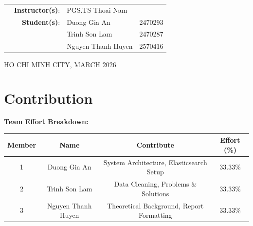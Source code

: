 \begin{titlepage}
\begin{table}[h]
\begin{tabular}{rrll}
\hspace{1 cm} & \textbf{Instructor(s)}: & PGS.TS Thoai Nam\\
        
& \textbf{Student(s)}: & Duong Gia An & 2470293\\
& & Trinh Son Lam & 2470287\\
& & Nguyen Thanh Huyen & 2570416\\

\end {tabular}
\end{table}
\vspace{1cm}
\begin{center}
{\footnotesize HO CHI MINH CITY, MARCH 2026}
\end{center}
\end{titlepage}

\newpage

\chapter*{Contribution}

\textbf{Team Effort Breakdown:}

\begin{center}
    \begin{tabular}{|c|c|c|c|}
        \hline
        \textbf{Member} & \textbf{Name} & \textbf{Contribute} & \textbf{Effort (\%)} \\
        \hline
        1 & Duong Gia An & System Architecture, Elasticsearch Setup & 33.33\% \\
        \hline
        2 & Trinh Son Lam & Data Cleaning, Problems \& Solutions & 33.33\% \\
        \hline
        3 & Nguyen Thanh Huyen & Theoretical Background, Report Formatting & 33.33\% \\
        \hline

    \end{tabular}
\end{center}

\pagestyle{empty}

\clearpage
\tableofcontents


\clearpage
{}
\renewcommand{\listfigurename}{List of Figures}
\listoffigures



